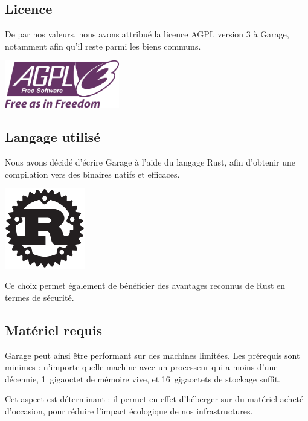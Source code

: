\documentclass[11pt, aspectratio=1610]{beamer}
\begin{document}
\subsection{Licence}
\begin{frame}
\begin{center}
De par nos valeurs, nous avons attribué la licence AGPL version 3 à Garage, notamment afin qu'il reste parmi les biens communs.\linebreak

\vspace{0.5cm}
\includegraphics[width=5cm]{agpl-v3-logo.png}\linebreak
\end{center}
\end{frame}

\subsection{Langage utilisé}
\begin{frame}
\begin{center}
Nous avons décidé d'écrire Garage à l'aide du langage Rust, afin d'obtenir une compilation vers des binaires natifs et efficaces.\linebreak

\includegraphics[width=3.5cm]{rust-logo.png}\linebreak

Ce choix permet également de bénéficier des avantages reconnus de Rust en termes de sécurité.
\end{center}
\end{frame}

\subsection{Matériel requis}
\begin{frame}
\begin{center}
Garage peut ainsi être performant sur des machines limitées. Les prérequis sont minimes : n'importe quelle machine avec un processeur qui a moins d'une décennie, 1~gigaoctet de mémoire vive, et 16~gigaoctets de stockage suffit.\linebreak

\vspace{1cm}

Cet aspect est déterminant : il permet en effet d'héberger sur du matériel acheté d'occasion, pour réduire l'impact écologique de nos infrastructures.
\end{center}
\end{frame}
\end{document}
